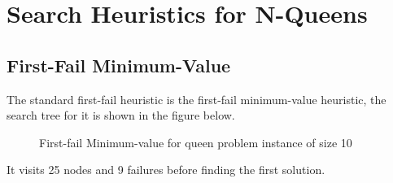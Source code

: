 \documentclass[a4paper, 11pt]{article}
\begin{document}
\section{Search Heuristics for N-Queens}
\subsection{First-Fail Minimum-Value}
The standard first-fail heuristic is the first-fail minimum-value heuristic, the search tree for it is shown in the figure below. 
\begin{figure}[H]
  \begin{center}
    \caption{First-fail Minimum-value for queen problem instance of size 10}
    \label{fig:ffvm10}
  \end{center}
\end{figure}
It visits 25 nodes and 9 failures before finding the first solution.
\end{document}
